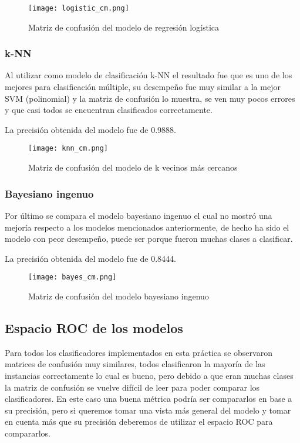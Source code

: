 \documentclass[sigconf,authorversion,nonacm]{acmart}
\begin{document}
\begin{figure}[H]
  \centering
  \texttt{[image: logistic\_cm.png]}
  \caption{Matriz de confusión del modelo de regresión logística}
\end{figure}

\subsubsection{k-NN}
Al utilizar como modelo de clasificación k-NN el resultado fue que es uno de los mejores para clasificación múltiple, su desempeño fue muy similar a la mejor SVM (polinomial) y la matriz de confusión lo muestra, se ven muy pocos errores y que casi todos se encuentran clasificados correctamente.

La precisión obtenida del modelo fue de 0.9888.

\begin{figure}[H]
  \centering
  \texttt{[image: knn\_cm.png]}
  \caption{Matriz de confusión del modelo de k vecinos más cercanos}
\end{figure}

\subsubsection{Bayesiano ingenuo}
Por último se compara el modelo bayesiano ingenuo el cual no mostró una mejoría respecto a los modelos mencionados anteriormente, de hecho ha sido el modelo con peor desempeño, puede ser porque fueron muchas clases a clasificar.

La precisión obtenida del modelo fue de 0.8444.

\begin{figure}[H]
  \centering
  \texttt{[image: bayes\_cm.png]}
  \caption{Matriz de confusión del modelo bayesiano ingenuo}
\end{figure}

\subsection{Espacio ROC de los modelos}
Para todos los clasificadores implementados en esta práctica se observaron matrices de confusión muy similares, todos clasificaron la mayoría de las instancias correctamente lo cual es bueno, pero debido a que eran muchas clases la matriz de confusión se vuelve difícil de leer para poder comparar los clasificadores. En este caso una buena métrica podría ser compararlos en base a su precisión, pero si queremos tomar una vista más general del modelo y tomar en cuenta más que su precisión deberemos de utilizar el espacio ROC para compararlos.
\end{document}
